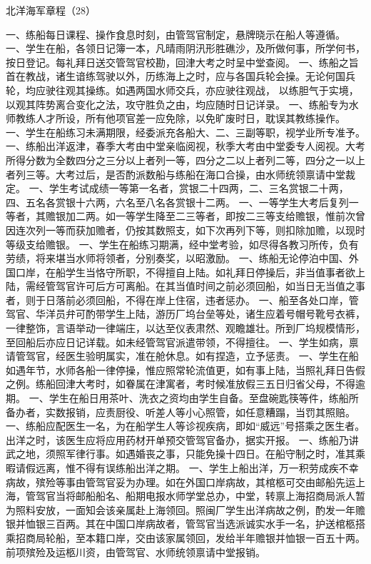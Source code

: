 \documentclass[12pt,UTF8]{ctexbook}
\begin{document}
北洋海军章程（28）

一、练船每日课程、操作食息时刻，由管驾官制定，悬牌晓示在船人等遵循。
一、学生在船，各领日记簿一本，凡晴雨阴汛形胜礁沙，及所做何事，所学何书，按日登记。每礼拜日送交管驾官校勘，回津大考之时呈中堂查阅。
一、练船之旨首在教战，诸生谙练驾驶以外，历练海上之时，应与各国兵轮会操。无论何国兵轮，均应驶往观其操练。如遇两国水师交兵，亦应驶往观战， 以练胆气于实境，以观其阵势离合变化之法，攻守胜负之由，均应随时日记详录。
一、练船专为水师教练人才所设，所有他项官差一应免除，以免旷废时日，耽误其教练操作。
一、学生在船练习未满期限，经委派充各船大、二、三副等职，视学业所专准予。
一、练船出洋返津，春季大考由中堂亲临阅视，秋季大考由中堂委专人阅视。大考所得分数为全数四分之三分以上者列一等，四分之二以上者列二等，四分之一以上者列三等。大考过后，是否酌派数船与练船在海口合操，由水师统领禀请中堂裁定。
一、学生考试成绩一等第一名者，赏银二十四两，二、三名赏银二十两，四、五名各赏银十六两，六名至八名各赏银十二两。
一、一等学生大考后复列一等者，其赡银加二两。如一等学生降至二三等者，即按二三等支给赡银，惟前次曾因连次列一等而获加赡者，仍按其数照支，如下次再列下等，则扣除加赡，以现时等级支给赡银。
一、学生在船练习期满，经中堂考验，如尽得各教习所传，负有劳绩，将来堪当水师将领者，分别奏奖，以昭激励。
一、练船无论停泊中国、外国口岸，在船学生当恪守所职，不得擅自上陆。如礼拜日停操后，非当值事者欲上陆，需经管驾官许可后方可离船。在其当值时间之前必须回船，如当日无当值之事者，则于日落前必须回船，不得在岸上住宿，违者惩办。
一、船至各处口岸，管驾官、华洋员弁可酌带学生上陆，游历厂坞台垒等处，诸生应着号帽号靴号衣裤，一律整饰，言语举动一律端庄，以达至仪表肃然、观瞻雄壮。所到厂坞规模情形，至回船后亦应日记详载。如未经管驾官派遣带领，不得擅往。
一、学生如病，禀请管驾官，经医生验明属实，准在舱休息。如有捏造，立予惩责。
一、学生在船如遇年节，水师各船一律停操，惟应照常轮流值更，如有事上陆，当照礼拜日告假之例。练船回津大考时，如眷属在津寓者，考时候准放假三五日归省父母，不得逾期。
一、学生在船日用茶叶、洗衣之资均由学生自备。至盘碗匙筷等件，练船所备办者，实数报销，应责厨役、听差人等小心照管，如任意糟蹋，当罚其照赔。
一、练船应配医生一名，为在船学生人等诊视疾病，即如“威远”号搭乘之医生者。出洋之时，该医生应将应用药材开单预交管驾官备办，据实开报。
一、练船乃讲武之地，须照军律行事。如遇婚丧之事，只能免操十四日。在船守制之时，准其乘暇请假远离，惟不得有误练船出洋之期。
一、学生上船出洋，万一积劳成疾不幸病故，殡殓等事由管驾官妥为办理。如在外国口岸病故，其棺柩可交由邮船先运上海，管驾官当将邮船船名、船期电报水师学堂总办，中堂，转禀上海招商局派人暂为照料安放，一面知会该亲属赴上海领回。照闽厂学生出洋病故之例，酌发一年赡银并恤银三百两。其在中国口岸病故者，管驾官当选派诚实水手一名，护送棺柩搭乘招商局轮船，至本籍口岸，交由该家属领回，发给半年赡银并恤银一百五十两。前项殡殓及运柩川资，由管驾官、水师统领禀请中堂报销。
\end{document}
